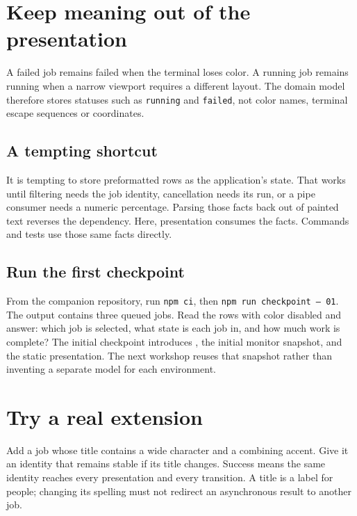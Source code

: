 \section{Keep meaning out of the presentation}

A failed job remains failed when the terminal loses color. A running job remains running when a narrow viewport requires a different layout. The domain model therefore stores statuses such as \texttt{running} and \texttt{failed}, not color names, terminal escape sequences or coordinates.

\subsection{A tempting shortcut}

It is tempting to store preformatted rows as the application's state. That works until filtering needs the job identity, cancellation needs its run, or a pipe consumer needs a numeric percentage. Parsing those facts back out of painted text reverses the dependency. Here, presentation consumes the facts. Commands and tests use those same facts directly.

\subsection{Run the first checkpoint}

From the companion repository, run \texttt{npm ci}, then \texttt{npm run checkpoint -- 01}. The output contains three queued jobs. Read the rows with color disabled and answer: which job is selected, what state is each job in, and how much work is complete? The initial checkpoint introduces , the initial monitor snapshot, and the static presentation. The next workshop reuses that snapshot rather than inventing a separate model for each environment.

\section{Try a real extension}

Add a job whose title contains a wide character and a combining accent. Give it an identity that remains stable if its title changes. Success means the same identity reaches every presentation and every transition. A title is a label for people; changing its spelling must not redirect an asynchronous result to another job.
